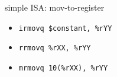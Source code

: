 
\begin{frame}[fragile,label=MovRegIntro]{simple ISA: mov-to-register}
    \begin{itemize}
        \item \lstinline|irmovq $constant, %rYY|
        \item \lstinline|rrmovq %rXX, %rYY|
        \item \lstinline|mrmovq 10(%rXX), %rYY|
    \end{itemize}
\end{frame}


